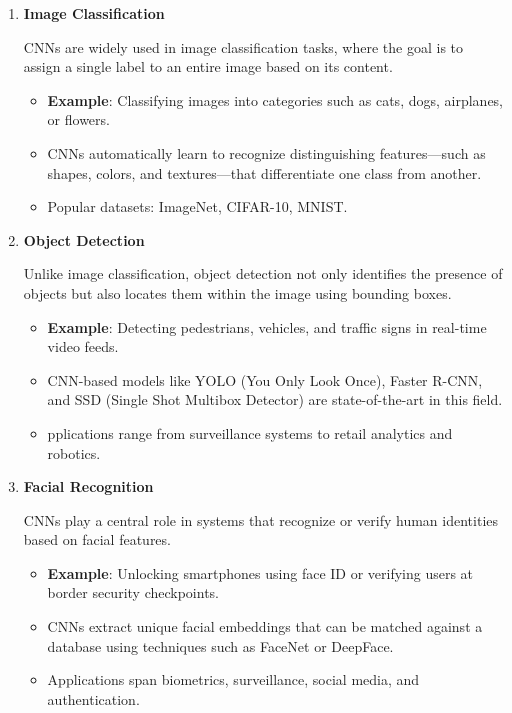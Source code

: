 \begin{enumerate}
    \item \textbf{Image Classification}
    
    CNNs are widely used in image classification tasks, where the goal is to assign a single label to an entire image based on its content.
    \begin{itemize}
        \item \textbf{Example}: Classifying images into categories such as cats, dogs, airplanes, or flowers.
        \item CNNs automatically learn to recognize distinguishing features—such as shapes, colors, and textures—that differentiate one class from another.
        \item Popular datasets: ImageNet, CIFAR-10, MNIST.
        

    \end{itemize}
    
    \item \textbf{Object Detection}
    
    Unlike image classification, object detection not only identifies the presence of objects but also locates them within the image using bounding boxes.
    \begin{itemize}
        \item \textbf{Example}: Detecting pedestrians, vehicles, and traffic signs in real-time video feeds.
        \item CNN-based models like YOLO (You Only Look Once), Faster R-CNN, and SSD (Single Shot Multibox Detector) are state-of-the-art in this field.
        \item pplications range from surveillance systems to retail analytics and robotics.




    \end{itemize}
    
    \item \textbf{Facial Recognition}
    
    CNNs play a central role in systems that recognize or verify human identities based on facial features.
    \begin{itemize}
        \item \textbf{Example}: Unlocking smartphones using face ID or verifying users at border security checkpoints.
        \item CNNs extract unique facial embeddings that can be matched against a database using techniques such as FaceNet or DeepFace.
        \item Applications span biometrics, surveillance, social media, and authentication.





\end{itemize}
\end{enumerate}
